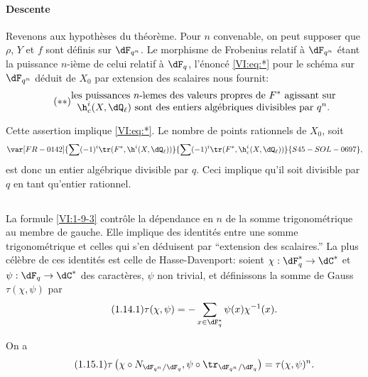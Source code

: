 \paragraph{Descente}
Revenons aux hypothèses du théorème. Pour $n$ convenable, on peut 
supposer que $\rho$, $Y$ et $f$ sont définis sur $\dF_{q^n}$. Le morphisme de 
Frobenius relatif à $\dF_{q^n}$ étant la puissance $n$-ième de celui 
relatif à $\dF_q$, l'énoncé \eqref{VI:eq:*} pour le schéma sur 
$\dF_{q^n}$ déduit de $X_0$ par extension des scalaires nous fournit: 
\begin{equation*}\tag{$**$}\label{VI:eq:**}
  \substack{\displaystyle\text{les puissances $n$-\`iemes des valeurs propres de $F^\ast$ agissant sur} \\ \displaystyle\text{$\h_c^i(X,\dQ_\ell)$ sont des entiers algébriques divisibles par $q^n$.}}
\end{equation*}

Cette assertion implique \eqref{VI:eq:*}. Le nombre de points rationnels de 
$X_0$, soit 
\[\var[FR-0142]{\sum (-1)^i \tr(F^\ast,\h^i(X,\dQ_\ell))}{\sum (-1)^i \tr(F^\ast,\h_c^i(X,\dQ_\ell))}{S45-SOL-0697}\text{,}\]
 est donc un entier 
algébrique divisible par $q$. Ceci implique qu'il soit divisible par $q$ en 
tant qu'entier rationnel. 






\subsection{}\label{VI:1-14}

La formule \ref{VI:1-9-3} contrôle la dépendance en $n$ de la somme 
trigonométrique au membre de gauche. Elle implique des identités entre une 
somme trigonométrique et celles qui s'en déduisent par ``extension des 
scalaires.'' La plus célèbre de ces identités est celle de 
Hasse-Davenport: soient $\chi:\dF_q^\ast \to \dC^\ast$ et 
$\psi:\dF_q\to \dC^\ast$ des caractères, $\psi$ non trivial, et 
définissons la somme de Gauss $\tau(\chi,\psi)$ par 
\begin{equation*}\tag{1.14.1}\label{VI:eq:1-14-1}
  \tau(\chi,\psi) = - \sum_{x\in \dF_q^\ast} \psi(x) \chi^{-1}(x) \text{.}
\end{equation*}





\begin{theorem_}\label{VI:1-15}
On a 
\begin{equation*}\tag{1.15.1}\label{VI:eq:1-15-1}
  \tau\left(\chi\circ N_{\dF_{q^n}/\dF_q},\psi\circ \tr_{\dF_{q^n}/\dF_q}\right) = \tau(\chi,\psi)^n \text{.}
\end{equation*}
\end{theorem_}

